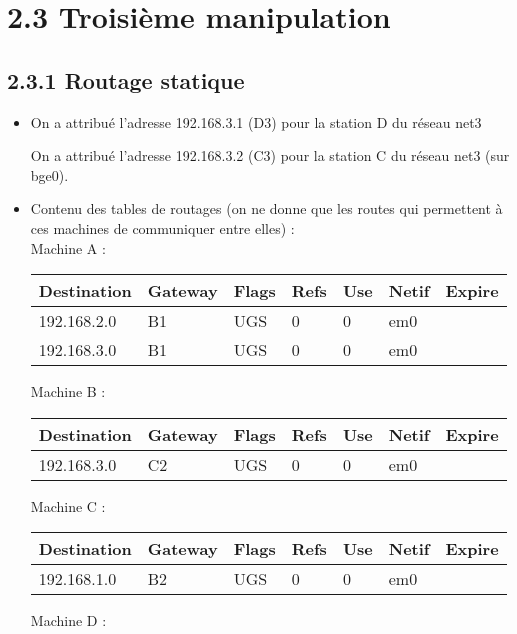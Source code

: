\documentclass{article}
\begin{document}
\section*{2.3 Troisième manipulation}

\subsection*{2.3.1 Routage statique}

\begin{itemize}\renewcommand{\labelitemi}{$\bullet$}
\item On a attribué l'adresse 192.168.3.1 (D3) pour la station D du réseau net3

On a attribué l'adresse 192.168.3.2 (C3) pour la station C du réseau net3 (sur bge0).

\item Contenu des tables de routages (on ne donne que les routes qui permettent à ces machines de communiquer entre elles) :\\

Machine A :

\begin{tabular}{|p{2cm}|p{2cm}|p{1cm}|p{1cm}|p{1cm}|p{2cm}|p{2cm}|}
\hline
Destination & Gateway & Flags & Refs & Use & Netif & Expire\\
\hline
192.168.2.0 & B1 & UGS & 0 & 0 & em0 & \\ 
\hline
192.168.3.0 & B1 & UGS & 0 & 0 & em0 & \\ 
\hline
\end{tabular}

Machine B : 

\begin{tabular}{|p{2cm}|p{2cm}|p{1cm}|p{1cm}|p{1cm}|p{2cm}|p{2cm}|}
\hline
Destination & Gateway & Flags & Refs & Use & Netif & Expire\\
\hline
192.168.3.0 & C2 & UGS & 0 & 0 & em0 & \\ 
\hline
\end{tabular}

Machine C :

\begin{tabular}{|p{2cm}|p{2cm}|p{1cm}|p{1cm}|p{1cm}|p{2cm}|p{2cm}|}
\hline
Destination & Gateway & Flags & Refs & Use & Netif & Expire\\
\hline
192.168.1.0 & B2 & UGS & 0 & 0 & em0 & \\ 
\hline
\end{tabular}

Machine D :


\end{itemize}
\end{document}
